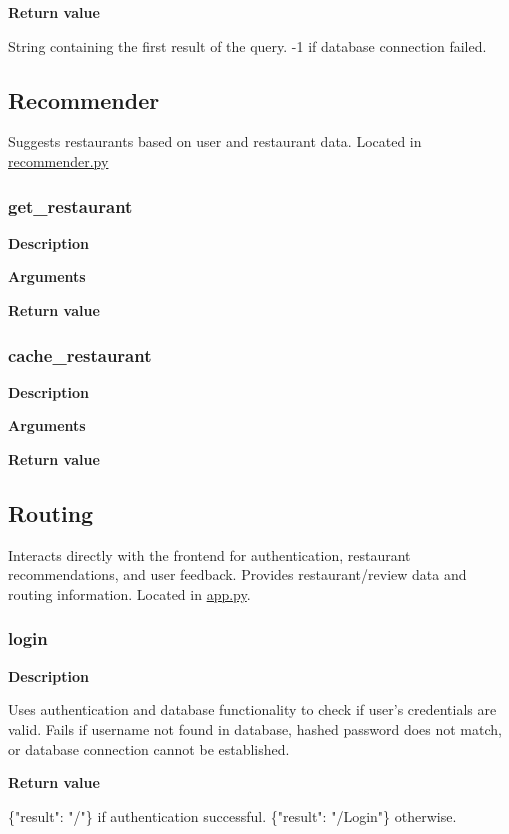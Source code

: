 \documentclass[11pt]{article}
\begin{document}
\textbf{Return value}

String containing the first result of the query. -1 if database connection failed.

\subsection{Recommender}
Suggests restaurants based on user and restaurant data. Located in \url{recommender.py}

\subsubsection{get\_restaurant}
\textbf{Description}

\textbf{Arguments}
\begin{deflist}
	\item[]
\end{deflist}

\textbf{Return value}

\subsubsection{cache\_restaurant}
\textbf{Description}

\textbf{Arguments}
\begin{deflist}
	\item[]
\end{deflist}

\textbf{Return value}

\subsection{Routing}
Interacts directly with the frontend for authentication, restaurant recommendations, and user feedback. Provides restaurant/review data and routing information. Located in \url{app.py}.

\subsubsection{login}
\textbf{Description}

Uses authentication and database functionality to check if user's credentials are valid. Fails if username not found in database, hashed password does not match, or database connection cannot be established.

\textbf{Return value}

\{"result": "/"\} if authentication successful. \{"result": "/Login"\} otherwise.
\end{document}
